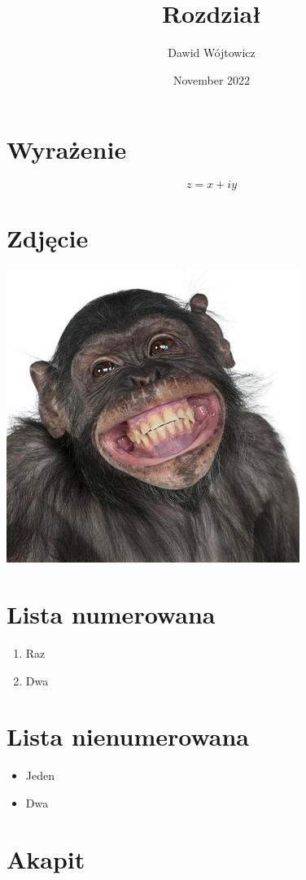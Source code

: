 \documentclass{article}
\title{Rozdział}
\author{Dawid Wójtowicz}
\date{November 2022}
\begin{document}
\maketitle

\section{Wyrażenie}
\[ z = x + iy \]

\section{Zdjęcie}
    \includegraphics{Pictures/monkey.jpg}
    \label{fig:malpa}


\section{Lista numerowana}
    \begin{enumerate}
    \item Raz
    \item Dwa
\end{enumerate}


\section{Lista nienumerowana}
    \begin{itemize}
     \item Jeden
     \item Dwa
     \end{itemize}

\section{Akapit}
\end{document}
